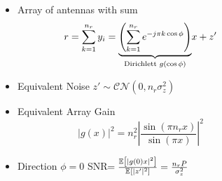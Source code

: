 \documentclass[xcolor=dvipsnames,aspectratio=169]{beamer}
\begin{document}
{\begin{columns}
\begin{column}{5cm}
 \end{column}
 \begin{column}{7cm}
 \begin{itemize}
  \item Array of antennas with sum
  $$r=\sum_{k=1}^{n_r} y_i=\underset{\textnormal{Dirichlett }g(\cos\phi)}{\underbrace{\left(\sum_{k=1}^{n_r} e^{-j\pi k \cos\phi}\right)}}x+z'$$
  \item Equivalent Noise $z'\sim\mathcal{CN}(0,n_r\sigma_{z}^2)$
  \item Equivalent Array Gain $$|g(x)|^2=n_r^2\left|\frac{\sin(\pi n_r x)}{\sin(\pi x)}\right|^2$$
  \item Direction $\phi=0$ SNR$=\frac{{\mathbb{E}_{}\left[|g(0)x|^2\right]}}{{\mathbb{E}_{}\left[|z'|^2\right]}}=\frac{n_rP}{\sigma_z^2}$
 \end{itemize}
 \end{column}
\end{columns}


}
\end{document}
